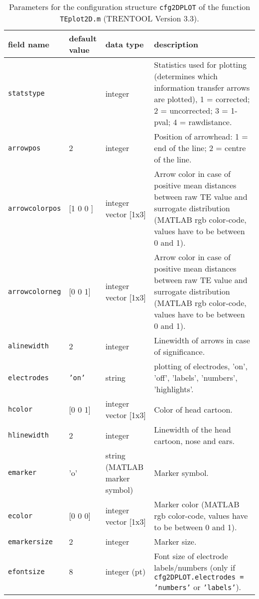 \begin{table}[H]
\small \centering
\caption[Parameters \texttt{cfg2DPLOT}]{Parameters for the configuration structure \texttt{cfg2DPLOT} of the function \texttt{TEplot2D.m} (TRENTOOL Version 3.3).} 
\begin{tabularx}{\textwidth}{p{2.5cm}p{1.5cm}L{3cm}X} \toprule
\textbf{field name} & \textbf{default value} & \textbf{data type} &\textbf{description} \\ \midrule
{}
\verb+statstype+ & & integer & Statistics used for plotting (determines which information transfer arrows are plotted), 1 = corrected; 2 = uncorrected; 3 = 1-pval; 4 = rawdistance.\\
\verb+arrowpos+ & 2 & integer & Position of arrowhead: 1 = end of the line; 2 = centre of the line.\\
\verb+arrowcolorpos+ & [1 0 0 ] & integer vector [1x3] & Arrow color in case of positive mean distances between raw TE value and surrogate distribution (MATLAB rgb color-code, values have to be between 0 and 1).\\
\verb+arrowcolorneg+ & [0 0 1] & integer vector [1x3] & Arrow color in case of positive mean distances between raw TE value and surrogate distribution (MATLAB rgb color-code, values have to be between 0 and 1).\\
\verb+alinewidth+ & 2 & integer & Linewidth of arrows in case of significance. \\
\verb+electrodes+ & \texttt{'on'} & string & plotting of electrodes, 'on', 'off', 'labels', 'numbers', 'highlights'.\\
\verb+hcolor+ & [0 0 1] & integer vector [1x3] & Color of head cartoon. \\
\verb+hlinewidth+ & 2 & integer & Linewidth of the head cartoon, nose and ears.\\
\verb+emarker+ & 'o' & string (MATLAB marker symbol) & Marker symbol.\\
\verb+ecolor + & [0 0 0] & integer vector [1x3] & Marker color (MATLAB rgb color-code, values have to be between 0 and 1).\\ 
\verb+emarkersize+ & 2 & integer & Marker size. \\
\verb+efontsize+ & 8 & integer (pt) & Font size of electrode labels/numbers (only if \texttt{cfg2DPLOT.electrodes = 'numbers'} or \texttt{'labels'}). \\

\end{tabularx}
\end{table}
